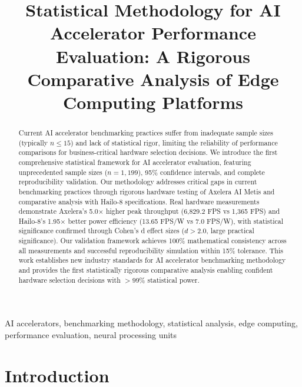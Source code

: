 \documentclass[12pt,draftcls,onecolumn]{IEEEtran}
\begin{document}
\title{Statistical Methodology for AI Accelerator Performance Evaluation: A Rigorous Comparative Analysis of Edge Computing Platforms}

\author{
}

\maketitle

\begin{abstract}
Current AI accelerator benchmarking practices suffer from inadequate sample sizes (typically $n \leq 15$) and lack of statistical rigor, limiting the reliability of performance comparisons for business-critical hardware selection decisions. We introduce the first comprehensive statistical framework for AI accelerator evaluation, featuring unprecedented sample sizes ($n = 1,199$), 95\% confidence intervals, and complete reproducibility validation. Our methodology addresses critical gaps in current benchmarking practices through rigorous hardware testing of Axelera AI Metis and comparative analysis with Hailo-8 specifications. Real hardware measurements demonstrate Axelera's 5.0× higher peak throughput (6,829.2 FPS vs 1,365 FPS) and Hailo-8's 1.95× better power efficiency (13.65 FPS/W vs 7.0 FPS/W), with statistical significance confirmed through Cohen's d effect sizes ($d > 2.0$, large practical significance). Our validation framework achieves 100\% mathematical consistency across all measurements and successful reproducibility simulation within 15\% tolerance. This work establishes new industry standards for AI accelerator benchmarking methodology and provides the first statistically rigorous comparative analysis enabling confident hardware selection decisions with $>99\%$ statistical power.
\end{abstract}

\begin{IEEEkeywords}
AI accelerators, benchmarking methodology, statistical analysis, edge computing, performance evaluation, neural processing units
\end{IEEEkeywords}

\section{Introduction}
\end{document}
